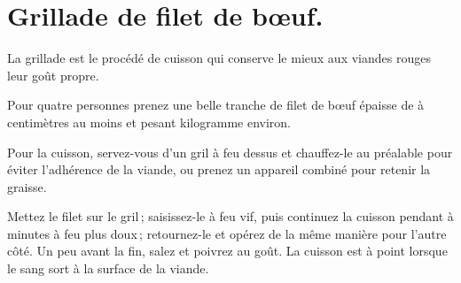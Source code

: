 \section*{\centering Grillade de filet de bœuf.}
{}

La grillade est le procédé de cuisson qui conserve le mieux aux viandes rouges
leur goût propre.

Pour quatre personnes prenez une belle tranche de filet de bœuf épaisse de
{\mmm} à {\mmm} centimètres au moins et pesant {\mmm}
kilogramme environ.

Pour la cuisson, servez-vous d'un gril à feu dessus et chauffez-le au préalable
pour éviter l’adhérence de la viande, ou prenez un appareil combiné pour
retenir la graisse.

Mettez le filet sur le gril ; saisissez-le à feu vif, puis continuez la cuisson
pendant {\mmm} à {\mmm} minutes à feu plus doux ; retournez-le et
opérez de la même manière pour l'autre côté. Un peu avant la fin, salez et
poivrez au goût. La cuisson est à point lorsque le sang sort à la surface de la
viande.

